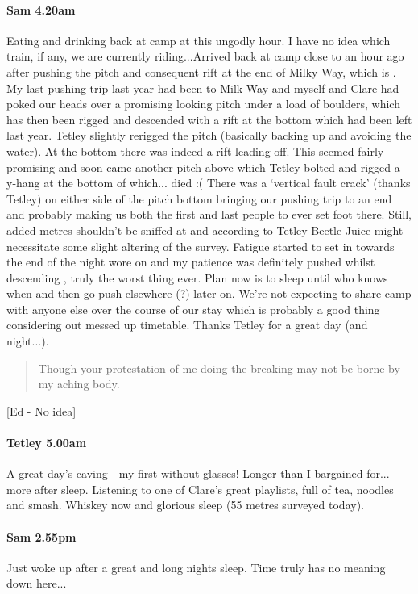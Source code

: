 \paragraph{Sam 4.20am}
Eating and drinking back at camp at this ungodly hour. I have no idea which train, if any, we are currently riding...Arrived back at camp close to an hour ago after pushing the pitch and consequent rift at the end of Milky Way, which is . My last pushing trip last year had been to Milk Way and myself and Clare had poked our heads over a promising looking pitch under a load of boulders, which has then been rigged and descended with a rift at the bottom which had been left last year. Tetley slightly rerigged the pitch (basically backing up and avoiding the water). At the bottom there was indeed a rift leading off. This seemed fairly promising and soon came another pitch above which Tetley bolted and rigged a y-hang at the bottom of which... died :( There was a ‘vertical fault crack’ (thanks Tetley) on either side of the pitch bottom bringing our pushing trip to an end and probably making us both the first and last people to ever set foot there. Still, added metres shouldn't be sniffed at and according to Tetley Beetle Juice might necessitate some slight altering of the survey. Fatigue started to set in towards the end of the night wore on and my patience was definitely pushed whilst descending , truly the worst thing ever. Plan now is to sleep until who knows when and then go push elsewhere (?) later on. We’re not expecting to share camp with anyone else over the course of our stay which is probably a good thing considering out messed up timetable.
Thanks Tetley for a great day (and night...). 



\begin{quote}Though your protestation of me doing the breaking may not be borne by my aching body. \end{quote} 
[Ed - No idea]


\paragraph{Tetley 5.00am}
A great day’s caving - my first without glasses! Longer than I bargained for... more after sleep. Listening to one of Clare’s great playlists, full of tea, noodles and smash. Whiskey now and glorious sleep (55 metres surveyed today).

\paragraph{Sam 2.55pm}
Just woke up after a great and long nights sleep. Time truly has no meaning down here...


